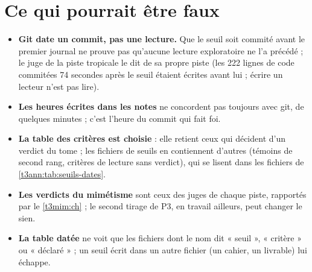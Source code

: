 \section{Ce qui pourrait être faux}\label{t3ann:sec:faux-a}

\begin{faux}
\begin{itemize}
\item \textbf{Git date un commit, pas une lecture.} Que le seuil soit commité avant le premier journal ne prouve pas qu'aucune lecture exploratoire ne l'a précédé ; le juge de la piste tropicale le dit de sa propre piste (les 222 lignes de code commitées 74 secondes après le seuil étaient écrites avant lui ; écrire un lecteur n'est pas lire).
\item \textbf{Les heures écrites dans les notes} ne concordent pas toujours avec git, de quelques minutes ; c'est l'heure du commit qui fait foi.
\item \textbf{La table des critères est choisie} : elle retient ceux qui décident d'un verdict du tome ; les fichiers de seuils en contiennent d'autres (témoins de second rang, critères de lecture sans verdict), qui se lisent dans les fichiers de \cref{t3ann:tab:seuils-dates}.
\item \textbf{Les verdicts du mimétisme} sont ceux des juges de chaque piste, rapportés par le \cref{t3mim:ch} ; le second tirage de P3, en travail ailleurs, peut changer le sien.
\item \textbf{La table datée} ne voit que les fichiers dont le nom dit « seuil », « critère » ou « déclaré » ; un seuil écrit dans un autre fichier (un cahier, un livrable) lui échappe.
\end{itemize}
\end{faux}
